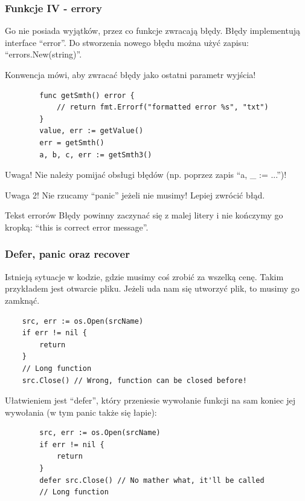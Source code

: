 \documentclass[10pt]{beamer}
\newcommand{\quotes}[1]{``#1''}
\begin{document}
\begin{frame}[fragile]
    \frametitle{Funkcje IV - errory}
    Go nie posiada wyjątków, przez co funkcje zwracają błędy.
    Błędy implementują interface \quotes{error}. Do stworzenia nowego błędu
    można użyć zapisu: \quotes{errors.New(string)}.

    Konwencja mówi, aby zwracać błędy jako ostatni parametr wyjścia!
    \begin{verbatim}
        func getSmth() error {
            // return fmt.Errorf("formatted error %s", "txt")
        }
        value, err := getValue()
        err = getSmth()
        a, b, c, err := getSmth3()
    \end{verbatim}

    \begin{alertblock}{Uwaga!}
        Nie należy pomijać obsługi błędów (np. poprzez zapis \quotes{a, \_ := ...})!
    \end{alertblock}

    \begin{alertblock}{Uwaga 2!}
        Nie rzucamy \quotes{panic} jeżeli nie musimy! Lepiej zwrócić błąd.
    \end{alertblock}

    \begin{block}{Tekst errorów}
        Błędy powinny zaczynać się z malej litery i nie kończymy go kropką:
        \quotes{this is correct error message}.
    \end{block}
\end{frame}

\begin{frame}[fragile]
    \frametitle{Defer, panic oraz recover}
    Istnieją sytuacje w kodzie, gdzie musimy coś zrobić za wszelką cenę. Takim przykładem
    jest otwarcie pliku. Jeżeli uda nam się utworzyć plik, to musimy go zamknąć.

    \begin{verbatim}
    src, err := os.Open(srcName)
    if err != nil {
        return
    }
    // Long function
    src.Close() // Wrong, function can be closed before!
    \end{verbatim}

    Ułatwieniem jest \quotes{defer}, który przeniesie wywołanie funkcji na sam koniec
    jej wywołania (w tym panic także się łapie):

    \begin{verbatim}
        src, err := os.Open(srcName)
        if err != nil {
            return
        }
        defer src.Close() // No mather what, it'll be called
        // Long function
    \end{verbatim}
\end{frame}
\end{document}

